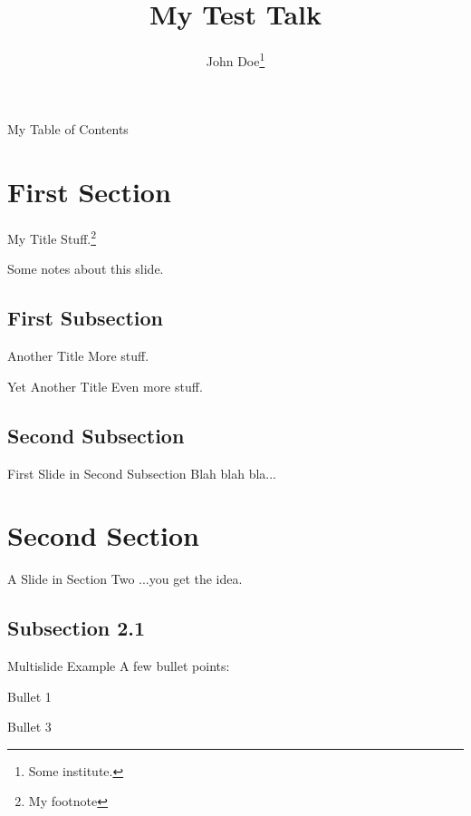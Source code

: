 \documentclass[12pt,notes]{talk}
\title{My Test Talk}
\author[John Doe]{John Doe\thanks{Some institute.}}
\begin{document}
\begin{slide}[plain]{}
  \maketitle
\end{slide}

\begin{slide}[outline]{My Table of Contents}
  \tableofcontents
\end{slide}

\section{First Section}

\begin{slide}{My Title}
  Stuff.\footnote{My footnote}
\end{slide}
\begin{notes}
  Some notes about this slide.
\end{notes}

\subsection{First Subsection}
\begin{slide}{Another Title}
  More stuff.
\end{slide}
\begin{slide}{Yet Another Title}
  Even more stuff.
\end{slide}

\subsection{Second Subsection}
\begin{slide}{First Slide in Second Subsection}
  Blah blah bla...
\end{slide}

\section{Second Section}

\begin{slide}{A Slide in Section Two}
  ...you get the idea.
\end{slide}

\subsection{Subsection 2.1}
\begin{multislide}{3}{Multislide Example}
  A few bullet points:
  \begin{itemize}
  \item Bullet 1
  {\item Bullet 3}
  \end{itemize}
\end{multislide}
\end{document}
